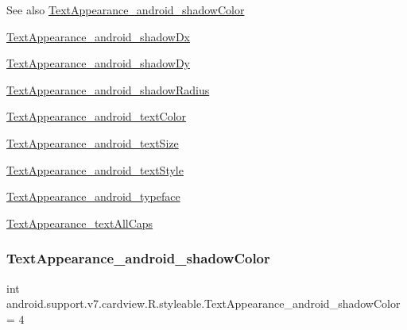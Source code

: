 \begin{DoxySeeAlso}{See also}
\hyperlink{classandroid_1_1support_1_1v7_1_1cardview_1_1R_1_1styleable_ac30541b7e882b5cbeca1ff294370508f}{Text\+Appearance\+\_\+android\+\_\+shadow\+Color} 

\hyperlink{classandroid_1_1support_1_1v7_1_1cardview_1_1R_1_1styleable_af78673669143ecb19f5c6539038cdabd}{Text\+Appearance\+\_\+android\+\_\+shadow\+Dx} 

\hyperlink{classandroid_1_1support_1_1v7_1_1cardview_1_1R_1_1styleable_aa8978ddd3e66c4c1da6e6c1ca8143122}{Text\+Appearance\+\_\+android\+\_\+shadow\+Dy} 

\hyperlink{classandroid_1_1support_1_1v7_1_1cardview_1_1R_1_1styleable_a0db854c5b0c5d17f58df560fc89ed0c3}{Text\+Appearance\+\_\+android\+\_\+shadow\+Radius} 

\hyperlink{classandroid_1_1support_1_1v7_1_1cardview_1_1R_1_1styleable_ab57942af638bda029a3f64c2f23ca03b}{Text\+Appearance\+\_\+android\+\_\+text\+Color} 

\hyperlink{classandroid_1_1support_1_1v7_1_1cardview_1_1R_1_1styleable_a9efe0769c1cb5492f1c2b8ff53b75f49}{Text\+Appearance\+\_\+android\+\_\+text\+Size} 

\hyperlink{classandroid_1_1support_1_1v7_1_1cardview_1_1R_1_1styleable_a2c5c2ce44fa4c6ed998a5a0580c7e67b}{Text\+Appearance\+\_\+android\+\_\+text\+Style} 

\hyperlink{classandroid_1_1support_1_1v7_1_1cardview_1_1R_1_1styleable_a3626f3ceb70d84f1c812ff1954d363f0}{Text\+Appearance\+\_\+android\+\_\+typeface} 

\hyperlink{classandroid_1_1support_1_1v7_1_1cardview_1_1R_1_1styleable_abc7c3f256d837bdb4a0b5aee27f448aa}{Text\+Appearance\+\_\+text\+All\+Caps} 
\end{DoxySeeAlso}
\mbox{\label{classandroid_1_1support_1_1v7_1_1cardview_1_1R_1_1styleable_ac30541b7e882b5cbeca1ff294370508f}} 
\subsubsection{\texorpdfstring{Text\+Appearance\+\_\+android\+\_\+shadow\+Color}{TextAppearance\_android\_shadowColor}}
{\footnotesize\ttfamily int android.\+support.\+v7.\+cardview.\+R.\+styleable.\+Text\+Appearance\+\_\+android\+\_\+shadow\+Color = 4\hspace{0.3cm}{\ttfamily [static]}}

